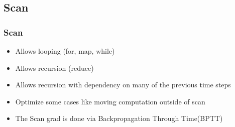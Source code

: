 \documentclass[utf8x,xcolor=pdftex,dvipsnames,table]{beamer}
\begin{document}

\subsection{Scan}
\begin{frame}
  \frametitle{Scan}
\begin{itemize}
\item Allows looping (for, map, while)
\item Allows recursion (reduce)
\item Allows recursion with dependency on many of the previous time steps
\item Optimize some cases like moving computation outside of scan
\item The Scan grad is done via Backpropagation Through Time(BPTT)
\end{itemize}
\end{frame}
\end{document}
